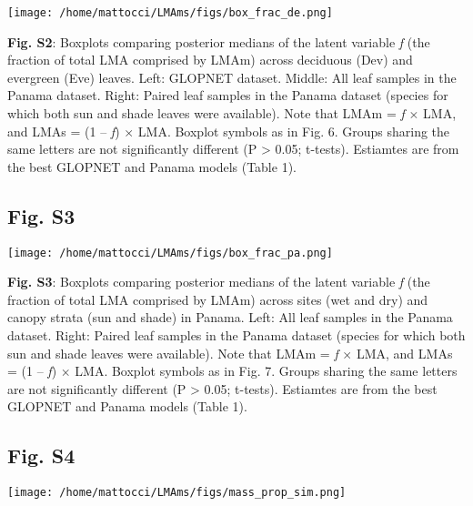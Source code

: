 \documentclass[
  12pt,
  letterpaper,
  DIV=11,
  numbers=noendperiod]{scrartcl}
\begin{document}
\texttt{[image: /home/mattocci/LMAms/figs/box\_frac\_de.png]}

\textbf{Fig. S2}: Boxplots comparing posterior medians of the latent
variable \emph{f} (the fraction of total LMA comprised by LMAm) across
deciduous (Dev) and evergreen (Eve) leaves. Left: GLOPNET dataset.
Middle: All leaf samples in the Panama dataset. Right: Paired leaf
samples in the Panama dataset (species for which both sun and shade
leaves were available). Note that LMAm = \emph{f} \(\times\) LMA, and
LMAs = (1 -- \emph{f}) \(\times\) LMA. Boxplot symbols as in Fig. 6.
Groups sharing the same letters are not significantly different (P
\textgreater{} 0.05; t-tests). Estiamtes are from the best GLOPNET and
Panama models (Table 1).

\newpage

\hypertarget{fig.-s3}{%
\subsection{Fig. S3}\label{fig.-s3}}

\texttt{[image: /home/mattocci/LMAms/figs/box\_frac\_pa.png]}

\textbf{Fig. S3}: Boxplots comparing posterior medians of the latent
variable \emph{f} (the fraction of total LMA comprised by LMAm) across
sites (wet and dry) and canopy strata (sun and shade) in Panama. Left:
All leaf samples in the Panama dataset. Right: Paired leaf samples in
the Panama dataset (species for which both sun and shade leaves were
available). Note that LMAm = \emph{f} \(\times\) LMA, and LMAs = (1 --
\emph{f}) \(\times\) LMA. Boxplot symbols as in Fig. 7. Groups sharing
the same letters are not significantly different (P \textgreater{} 0.05;
t-tests). Estiamtes are from the best GLOPNET and Panama models (Table
1).

\newpage

\hypertarget{fig.-s4}{%
\subsection{Fig. S4}\label{fig.-s4}}

\texttt{[image: /home/mattocci/LMAms/figs/mass\_prop\_sim.png]}
\end{document}
